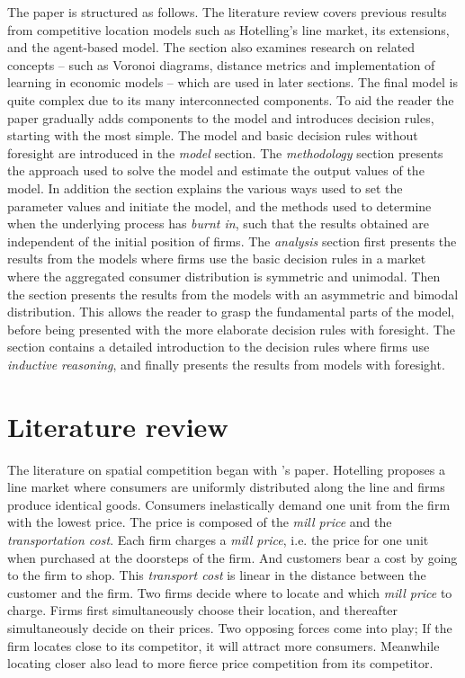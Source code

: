 \documentclass[preprint, 12pt]{elsarticle}
\begin{document}
The paper is structured as follows. The literature review covers previous results from competitive location models such as Hotelling's line market, its extensions, and the agent-based model. The section also examines research on related concepts -- such as Voronoi diagrams, distance metrics and implementation of learning in economic models -- which are used in later sections. The final model is quite complex due to its many interconnected components. To aid the reader the paper gradually adds components to the model and introduces decision rules, starting with the most simple. The model and basic decision rules without foresight are introduced in the \emph{model} section. The \emph{methodology} section presents the approach used to solve the model and estimate the output values of the model. In addition the section explains the various ways used to set the parameter values and initiate the model, and the methods used to determine when the underlying process has \emph{burnt in}, such that the results obtained are independent of the initial position of firms. The \emph{analysis} section first presents the results from the models where firms use the basic decision rules in a market where the aggregated consumer distribution is symmetric and unimodal. Then the section presents the results from the models with an asymmetric and bimodal distribution. This allows the reader to grasp the fundamental parts of the model, before being presented with the more elaborate decision rules with foresight. The section contains a detailed introduction to the decision rules where firms use \emph{inductive reasoning}, and finally presents the results from models with foresight.


\section{Literature review}

The literature on spatial competition began with \citeauthor{Hotelling_1929}'s \citeyearpar{Hotelling_1929} paper. Hotelling proposes a line market where consumers are uniformly distributed along the line and firms produce identical goods. Consumers inelastically demand one unit from the firm with the lowest price. The price is composed of the \emph{mill price} and the \emph{transportation cost}. Each firm charges a \emph{mill price}, i.e. the price for one unit when purchased at the doorsteps of the firm. And customers bear a cost by going to the firm to shop. This \emph{transport cost} is linear in the distance between the customer and the firm. Two firms decide where to locate and which \emph{mill price} to charge. Firms first simultaneously choose their location, and thereafter simultaneously decide on their prices. Two opposing forces come into play; If the firm locates close to its competitor, it will attract more consumers. Meanwhile locating closer also lead to more fierce price competition from its competitor.
\end{document}
